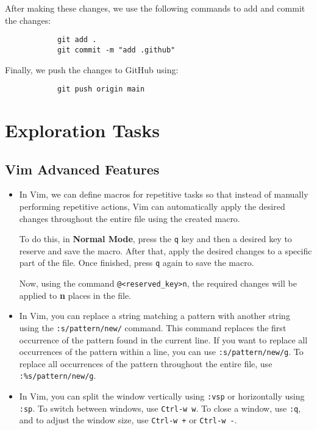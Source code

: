 \documentclass{article}
\begin{document}
            After making these changes, we use the following commands to add and commit the changes:
            \begin{verbatim}
            git add .
            git commit -m "add .github"
            \end{verbatim}
            Finally, we push the changes to GitHub using:
            \begin{verbatim}
            git push origin main
            \end{verbatim}


\section{Exploration Tasks}
    \subsection{Vim Advanced Features}
        \begin{itemize}
            \item 
            In Vim, we can define macros for repetitive tasks so that instead of manually performing repetitive actions, Vim can automatically apply the desired changes throughout the entire file using the created macro. 
    
            To do this, in \textbf{Normal Mode}, press the \texttt{q} key and then a desired key to reserve and save the macro. After that, apply the desired changes to a specific part of the file. Once finished, press \texttt{q} again to save the macro. 
    
            Now, using the command \texttt{@<reserved\_key>n}, the required changes will be applied to \textbf{n} places in the file.

            
            \item 
            In Vim, you can replace a string matching a pattern with another string using the \texttt{:s/pattern/new/} command. This command replaces the first occurrence of the pattern found in the current line. If you want to replace all occurrences of the pattern within a line, you can use \texttt{:s/pattern/new/g}. To replace all occurrences of the pattern throughout the entire file, use \texttt{:\%s/pattern/new/g}.

            \item 
            In Vim, you can split the window vertically using \texttt{:vsp} or horizontally using \texttt{:sp}. To switch between windows, use \texttt{Ctrl-w w}. To close a window, use \texttt{:q}, and to adjust the window size, use \texttt{Ctrl-w +} or \texttt{Ctrl-w -}.

        \end{itemize} 

        
\end{document}
